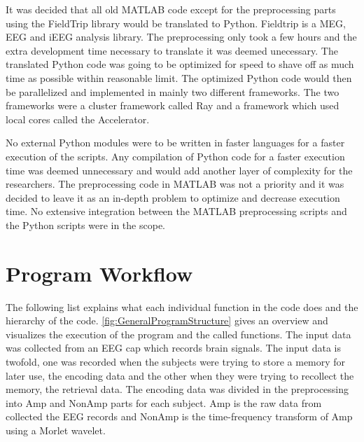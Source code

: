 \documentclass[12pt, a4paper]{article}
\begin{document}
It was decided that all old MATLAB code except for the preprocessing parts using the FieldTrip library would be translated to Python.
Fieldtrip is a MEG, EEG and iEEG analysis library\cite{Oostenveld2010}.
The preprocessing only took a few hours and the extra development time necessary to translate it was deemed unecessary. 
The translated Python code was going to be optimized for speed to shave off as much time as possible within reasonable limit.
The optimized Python code would then be parallelized and implemented in mainly two different frameworks.
The two frameworks were a cluster framework called Ray and a framework which used local cores called the Accelerator.

No external Python modules were to be written in faster languages for a faster execution of the scripts.
Any compilation of Python code for a faster execution time was deemed unnecessary and would add another layer of complexity for the researchers.
The preprocessing code in MATLAB was not a priority and it was decided to leave it as an in-depth problem to optimize and decrease execution time.
No extensive integration between the MATLAB preprocessing scripts and the Python scripts were in the scope.


\section{Program Workflow}

The following list explains what each individual function in the code does and the hierarchy of the code.
\cref{fig:GeneralProgramStructure} gives an overview and visualizes the execution of the program and the called functions.
The input data was collected from an EEG cap which records brain signals.
The input data is twofold, one was recorded when the subjects were trying to store a memory for later use, the encoding data and the other when they were trying to recollect the memory, the retrieval data.
The encoding data was divided in the preprocessing into Amp and NonAmp parts for each subject. 
Amp is the raw data from collected the EEG records and NonAmp is the time-frequency transform of Amp using a Morlet wavelet.%
\end{document}
